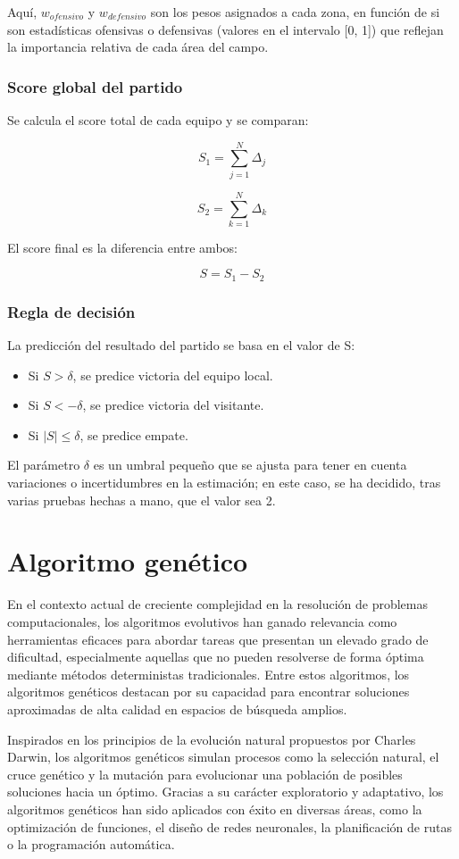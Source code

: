 Aquí, $w_{ofensivo}$ y $w_{defensivo}$ son los pesos asignados a cada zona, en función de si son estadísticas ofensivas o defensivas (valores en el intervalo [0, 1]) que
reflejan la importancia relativa de cada área del campo.

\subsubsection*{Score global del partido}
Se calcula el score total de cada equipo y se comparan:

\[S_1 = \sum_{j=1}^{N} \Delta_j\] 

\[S_2 = \sum_{k=1}^{N} \Delta_k \]

El score final es la diferencia entre ambos:

\[ S = S_1 - S_2\]

\subsubsection*{Regla de decisión}
La predicción del resultado del partido se basa en el valor de S:
\begin{itemize}
    \item Si $S > \delta$, se predice victoria del equipo local.
    \item Si $S < -\delta$, se predice victoria del visitante.
    \item Si $|S| \leq \delta$, se predice empate.
\end{itemize}

El parámetro $\delta$ es un umbral pequeño que se ajusta para tener en cuenta variaciones o incertidumbres en la estimación; en este caso, se ha decidido, tras varias pruebas hechas a mano, que el valor sea 2.

\section{Algoritmo genético}
En el contexto actual de creciente complejidad en la resolución de problemas computacionales, los algoritmos evolutivos han ganado relevancia como herramientas eficaces para abordar tareas que presentan un elevado grado de dificultad, especialmente aquellas que no pueden resolverse de forma óptima mediante métodos deterministas tradicionales. Entre estos algoritmos, los algoritmos genéticos destacan por su capacidad para encontrar soluciones aproximadas de alta calidad en espacios de búsqueda amplios.

Inspirados en los principios de la evolución natural propuestos por Charles Darwin, los algoritmos genéticos simulan procesos como la selección natural, el cruce genético y la mutación para evolucionar una población de posibles soluciones hacia un óptimo. Gracias a su carácter exploratorio y adaptativo, los algoritmos genéticos han sido aplicados con éxito en diversas áreas, como la optimización de funciones, el diseño de redes neuronales, la planificación de rutas o la programación automática.

